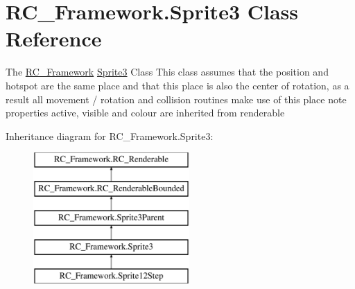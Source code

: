 \hypertarget{class_r_c___framework_1_1_sprite3}{}\section{R\+C\+\_\+\+Framework.\+Sprite3 Class Reference}
\label{class_r_c___framework_1_1_sprite3}


The \mbox{\hyperlink{namespace_r_c___framework}{R\+C\+\_\+\+Framework}} \mbox{\hyperlink{class_r_c___framework_1_1_sprite3}{Sprite3}} Class This class assumes that the position and hotspot are the same place and that this place is also the center of rotation, as a result all movement / rotation and collision routines make use of this place note properties active, visible and colour are inherited from renderable  


Inheritance diagram for R\+C\+\_\+\+Framework.\+Sprite3\+:\begin{figure}[H]
\begin{center}
\leavevmode
\includegraphics[height=5.000000cm]{class_r_c___framework_1_1_sprite3}
\end{center}
\end{figure}
